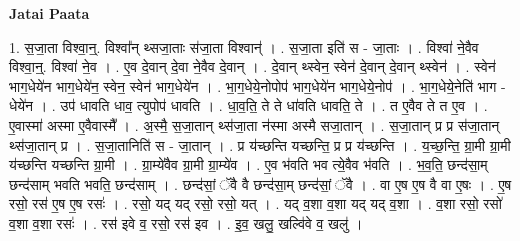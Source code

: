 \documentclass[17pt]{extarticle}
\begin{document}
\textbf{Jatai Paata} \newline

1. स॒जा॒ता विश्वा॒न्॒. विश्वा᳚न् थ्सजा॒ताः स॑जा॒ता विश्वान्॑ । . स॒जा॒ता इति॑ स - जा॒ताः । . विश्वा॑ ने॒वैव विश्वा॒न्॒. विश्वा॑ ने॒व । . ए॒व दे॒वान् दे॒वा ने॒वैव दे॒वान् । . दे॒वान् थ्स्वेन॒ स्वेन॑ दे॒वान् दे॒वान् थ्स्वेन॑ । . स्वेन॑ भाग॒धेये॑न भाग॒धेये॑न॒ स्वेन॒ स्वेन॑ भाग॒धेये॑न । . भा॒ग॒धेये॒नोपोप॑ भाग॒धेये॑न भाग॒धेये॒नोप॑ । . भा॒ग॒धेये॒नेति॑ भाग - धेये॑न । . उप॑ धावति धाव॒ त्युपोप॑ धावति । . धा॒व॒ति॒ ते ते धा॑वति धावति॒ ते । . त ए॒वैव ते त ए॒व । . ए॒वास्मा॑ अस्मा ए॒वैवास्मै᳚ । . अ॒स्मै॒ स॒जा॒तान् थ्स॑जा॒ता न॑स्मा अस्मै सजा॒तान् । . स॒जा॒तान् प्र प्र स॑जा॒तान् थ्स॑जा॒तान् प्र । . स॒जा॒तानिति॑ स - जा॒तान् । . प्र य॑च्छन्ति यच्छन्ति॒ प्र प्र य॑च्छन्ति । . य॒च्छ॒न्ति॒ ग्रा॒मी ग्रा॒मी य॑च्छन्ति यच्छन्ति ग्रा॒मी । . ग्रा॒म्ये॑वैव ग्रा॒मी ग्रा॒म्ये॑व । . ए॒व भ॑वति भव त्ये॒वैव भ॑वति । . भ॒व॒ति॒ छन्द॑सा॒म् छन्द॑साम् भवति भवति॒ छन्द॑साम् । . छन्द॑सां॒ ॅवै वै छन्द॑सा॒म् छन्द॑सां॒ ॅवै । . वा ए॒ष ए॒ष वै वा ए॒षः । . ए॒ष रसो॒ रस॑ ए॒ष ए॒ष रसः॑ । . रसो॒ यद् यद् रसो॒ रसो॒ यत् । . यद् व॒शा व॒शा यद् यद् व॒शा । . व॒शा रसो॒ रसो॑ व॒शा व॒शा रसः॑ । . रस॑ इवे व॒ रसो॒ रस॑ इव । . इ॒व॒ खलु॒ खल्वि॑वे व॒ खलु॑ । \newline
\end{document}
